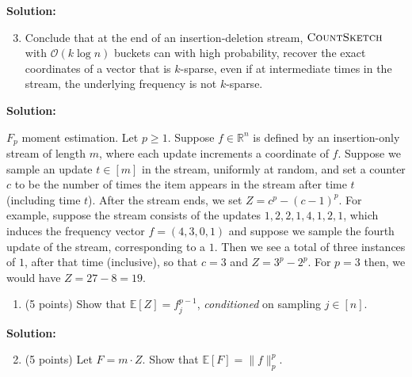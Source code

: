 \documentclass[11pt]{article}
\newcommand{\Ex}[1]{\ensuremath{\mathbb{E}\left[#1\right]}}
\newcommand{\CountSketch}{\textsc{CountSketch}}
\begin{document}
\noindent\textbf{Solution:}






\begin{enumerate}
\setcounter{enumi}{2}
\item
Conclude that at the end of an insertion-deletion stream, $\CountSketch$ with $\mathcal{O}(k\log n)$ buckets can with high probability, recover the exact coordinates of a vector that is $k$-sparse, even if at intermediate times in the stream, the underlying frequency is not $k$-sparse.
\end{enumerate}

\noindent\textbf{Solution:}














\newpage\noindent
$F_p$ moment estimation. 
\vskip 0.1in\noindent
Let $p\ge 1$. 
Suppose $f\in\mathbb{R}^n$ is defined by an insertion-only stream of length $m$, where each update increments a coordinate of $f$. 
Suppose we sample an update $t\in[m]$ in the stream, uniformly at random, and set a counter $c$ to be the number of times the item appears in the stream after time $t$ (including time $t$). 
After the stream ends, we set $Z=c^p-(c-1)^p$. 
\vskip 0.1in\noindent
For example, suppose the stream consists of the updates $1,2,2,1,4,1,2,1$, which induces the frequency vector $f=(4,3,0,1)$ and suppose we sample the fourth update of the stream, corresponding to a $1$. 
Then we see a total of three instances of $1$, after that time (inclusive), so that $c=3$ and $Z=3^p-2^p$. 
For $p=3$ then, we would have $Z=27-8=19$. 
\begin{enumerate}
\item (5 points)
Show that $\Ex{Z}=f_j^{p-1}$, \emph{conditioned} on sampling $j\in[n]$.
\end{enumerate}

\noindent\textbf{Solution:}


\begin{enumerate}
\setcounter{enumi}{1}
\item (5 points)
Let $F=m\cdot Z$. 
Show that $\Ex{F}=\|f\|_p^p$. 
\end{enumerate}
\end{document}
